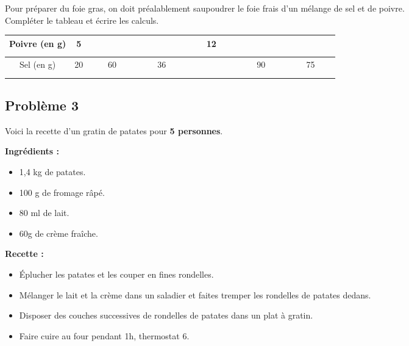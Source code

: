 Pour préparer du foie gras, on doit préalablement saupoudrer le foie frais d'un mélange de sel et de poivre. \\
Compléter le tableau et écrire les calculs.

\begin{center}\begin{tabular}{|c|c|c|c|c|c|c|} \hline
  Poivre (en g) &  5 &  $\phantom{\dfrac{azertyuiop}{O}}$  &   $\phantom{\dfrac{azertyuiop}{O}}$ & 12 &  $\phantom{\dfrac{azertyuiop}{O}}$  &  $\phantom{\dfrac{azertyuiop}{O}}$  \\  \hline
  Sel (en g)    & 20 & 60 & 36 &  $\phantom{\dfrac{azertyuiop}{O}}$  & 90 & 75 \\  \hline
\end{tabular}\end{center}

\Pointilles[5] 

\subsection*{Problème 3}

Voici la recette d'un gratin de patates pour \textbf{5 personnes}. 

\begin{minipage}[t]{0.45\textwidth}
  \textbf{Ingrédients : }
  \begin{itemize}
    \item 1,4 kg de patates.
    \item 100 g de fromage râpé.
    \item 80 ml de lait.
    \item 60g de crème fraîche.
  \end{itemize}

\end{minipage}
\begin{minipage}[t]{0.5\textwidth}
  \textbf{Recette :}
  \begin{itemize}
    \item Éplucher les patates et les couper en fines rondelles.
    \item Mélanger le lait et la crème dans un saladier et faites tremper les rondelles de patates dedans.
    \item Disposer des couches successives de rondelles de patates dans un plat à gratin. 
    \item Faire cuire au four pendant 1h, thermostat 6.
  \end{itemize}
\end{minipage}


